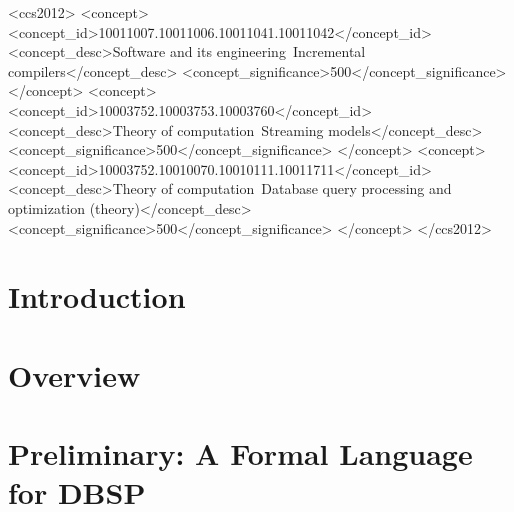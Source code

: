 \documentclass[acmsmall,screen,nonacm]{acmart}
\theoremstyle{compactdef}
\begin{document}
\begin{CCSXML}
<ccs2012>
   <concept>
       <concept_id>10011007.10011006.10011041.10011042</concept_id>
       <concept_desc>Software and its engineering~Incremental compilers</concept_desc>
       <concept_significance>500</concept_significance>
       </concept>
   <concept>
       <concept_id>10003752.10003753.10003760</concept_id>
       <concept_desc>Theory of computation~Streaming models</concept_desc>
       <concept_significance>500</concept_significance>
       </concept>
   <concept>
       <concept_id>10003752.10010070.10010111.10011711</concept_id>
       <concept_desc>Theory of computation~Database query processing and optimization (theory)</concept_desc>
       <concept_significance>500</concept_significance>
       </concept>
 </ccs2012>
\end{CCSXML}






\maketitle

\section{Introduction}\label{sec:intro}


\section{Overview}\label{sec:overview}


\section{Preliminary: A Formal Language for DBSP}\label{sec:preliminary}

\end{document}
